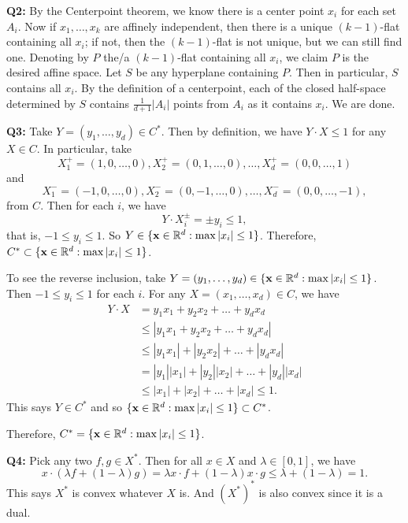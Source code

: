 \documentclass[12pt,reqno]{amsart}
\theoremstyle{definition}
\newcommand{\RR}{\mathbb{R}}
\begin{document}
\newpage

\noindent \textbf{Q2:} By the Centerpoint theorem, we know there is a center point $x_i$ for each set $A_i$. Now if $x_1,\dots, x_k$ are affinely independent, then there is a unique $(k-1)$-flat containing all $x_i$; if not, then the $(k-1)$-flat is not unique, but we can still find one. Denoting by $P$ the/a $(k-1)$-flat containing all $x_i$, we claim $P$ is the desired affine space. Let $S$ be any hyperplane containing $P$. Then in particular, $S$ contains all $x_i$. By the definition of a centerpoint, each of the closed half-space determined by $S$ contains $\frac{1}{d+1}|A_i|$ points from $A_i$ as it contains $x_i$. We are done.



\newpage
\noindent \textbf{Q3:} Take $Y=(y_1,\dots,y_d)\in C^*$. Then by definition, we have $Y\cdot X\leq 1$ for any $X\in C$. In particular, take $$X_1^+ = (1,0,\dots,0), X_2^+=(0,1,\dots,0),\dots, X_d^+=(0,0,\dots,1)$$ and $$X_1^- = (-1,0,\dots,0), X_2^-=(0,-1,\dots,0),\dots, X_d^-=(0,0,\dots,-1),$$ from $C$. Then for each $i$, we have $$Y\cdot X_i^{\pm} = \pm y_i \leq 1,$$ that is, $-1\leq y_i\leq 1$. So $Y\in \{\bold{x}\in \RR^d: \max{|x_i|}\leq 1\}$. Therefore, $C^* \subset \{\bold{x}\in \RR^d: \max{|x_i|}\leq 1\}$.


To see the reverse inclusion, take $Y=(y_1,\dots,y_d)\in  \{\bold{x}\in \RR^d: \max{|x_i|}\leq 1\}$. Then $-1\leq y_i\leq 1$ for each $i$. For any $X=(x_1,\dots,x_d)\in C$, we have
\begin{align*}
  Y\cdot X & = y_1x_1 + y_2 x_2+\dots+y_d x_d            \\
           & \leq |y_1x_1 + y_2 x_2+\dots+y_d x_d|       \\
           & \leq |y_1x_1| + |y_2 x_2|+\dots+|y_d x_d|   \\
           & = |y_1||x_1| + |y_2||x_2|+\dots+|y_d|| x_d| \\
           & \leq |x_1| + |x_2|+\dots+| x_d| \leq 1.
\end{align*}
This says $Y\in C^*$ and so $\{\bold{x}\in \RR^d: \max{|x_i|}\leq 1\} \subset C^*$.


Therefore, $C^*  =\{\bold{x}\in \RR^d: \max{|x_i|}\leq 1\} $.


\newpage

\noindent \textbf{Q4:} Pick any two $f,g\in X^*$. Then for all $x\in X$ and $\lambda\in [0,1]$, we have
$$x\cdot (\lambda f+(1-\lambda)g) = \lambda x\cdot f+(1-\lambda) x\cdot g \leq \lambda+(1-\lambda) = 1.$$ This says $X^*$ is convex whatever $X$ is. And $(X^*)^*$ is also convex since it is a dual.
\end{document}
